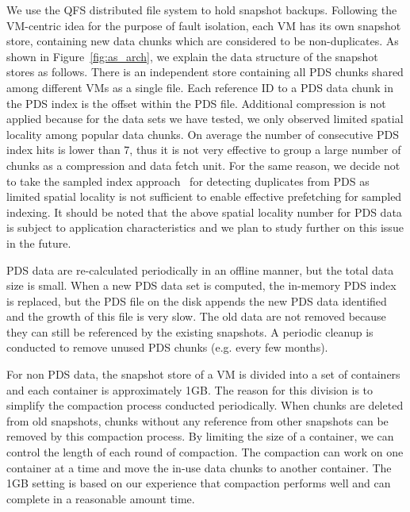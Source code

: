We use the QFS distributed file system to hold snapshot backups.
Following the VM-centric idea for the purpose of fault isolation,
each VM has its own snapshot store, containing new data chunks which are considered
to be non-duplicates.
As shown in Figure~\ref{fig:as_arch}, we explain the data structure of the snapshot stores as follows.
There is an independent store containing all PDS chunks shared among different VMs as
a single file.
Each reference ID to a PDS data chunk in the PDS index is the offset within the PDS file.
Additional compression is not applied because 
for the data sets we have tested, we only observed limited spatial locality 
among popular data chunks. On average the number of consecutive PDS index hits is lower than 7,
thus it is not very effective to group a large number of chunks as a compression and data fetch unit. 
For the same reason, we decide not to take the sampled index approach~\cite{Guo2011} 
for detecting duplicates from PDS as limited spatial locality is not sufficient to enable
effective prefetching for sampled indexing.
It should be noted that the above spatial locality number for PDS data 
is subject to application characteristics and we plan to study further on this issue in the future.

PDS data are re-calculated periodically in an offline manner, but 
the total data size is small.  When
a new PDS data  set is computed, the in-memory PDS index is replaced, but 
the PDS file on the disk appends the  new PDS data identified and the growth of this file is very slow. 
The old data are not removed because they can still be referenced by the existing snapshots. 
A periodic cleanup is conducted  to remove unused PDS chunks (e.g. every few months). 


For non PDS data, the snapshot store of a VM is  divided into a set of containers and 
each container is approximately 1GB.  The reason for this  division is to simplify the compaction process
conducted periodically. When  chunks are deleted from old snapshots,
chunks without any reference from other snapshots can be removed by this compaction process.
By limiting the size of a container, we can control the length of each round of compaction.
The compaction  can work on one container at a time and move the in-use data chunks to another container. 
The 1GB setting is based on our experience that compaction 
performs well and can  complete  in a reasonable amount time.

